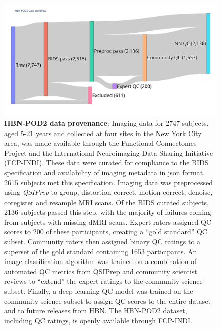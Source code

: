 \documentclass[fleqn,10pt]{wlscirep}
\begin{document}
\begin{figure}[ht]
    \centering
    \includegraphics[width=0.75\linewidth]{hbn-pod2-sankey.png}
    \caption{%
        {\bf HBN-POD2 data provenance}:
        Imaging data for \num{2747} subjects, aged 5-21 years and collected at four
        sites in the New York City area, was made available through the
        Functional Connectomes Project and the International Neuroimaging
        Data-Sharing Initiative (FCP-INDI).
        These data were curated for compliance to the BIDS specification
        \cite{gorgolewski2016-lh} and availability of imaging metadata in json
        format. \num{2615} subjects met this specification.
        Imaging data was preprocessed using \emph{QSIPrep} \cite{cieslak2021-iq}
        to group, distortion correct, motion correct, denoise, coregister and
        resample MRI scans. Of the BIDS curated subjects, \num{2136} subjects
        passed this step, with the majority of failures coming from subjects
        with missing dMRI scans.
        Expert raters assigned QC scores to \num{200} of these participants,
        creating a ``gold standard'' QC subset. Community raters then assigned
        binary QC ratings to a superset of the gold standard containing
        \num{1653} participants. An image classification algorithm was trained
        on a combination of automated QC metrics from QSIPrep and community
        scientist reviews to ``extend'' the expert ratings to the community
        science subset.  Finally, a deep learning QC model was trained on the
        community science subset to assign QC scores to the entire dataset and
        to future releases from HBN.
        The HBN-POD2 dataset, including QC ratings, is openly available through
        FCP-INDI.
    }
    \label{fig:hbn-sankey}
\end{figure}
\end{document}
